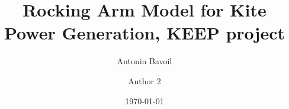 \documentclass[OptSoft]{jtcam_preprint}
\title{Rocking Arm Model for Kite Power Generation, KEEP project}
\author[1]{\orcid{0009-0009-7987-1573}Antonin Bavoil}
\author[2]{Author 2}
\affil[1]{Affiliation 1}
\affil[2]{Affiliation 2}
\date{\today}
\begin{document}
\tableofcontents
\clearpage









\appendix





\clearpage
\printglossaries
\end{document}
